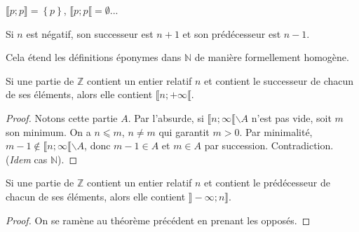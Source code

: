 \begin{remark}
\(⟦𝑝;𝑝⟧=\left\{𝑝\right\}\), \(⟦𝑝;𝑝⟦=∅\)...
\end{remark}
\begin{terminology}
Si \(𝑛\) est négatif, son successeur est \(𝑛+1\) et son prédécesseur est \(𝑛-1\).
\end{terminology}
\begin{remark}
Cela étend les définitions éponymes dans \(ℕ\) de manière formellement homogène.
\end{remark}
\begin{theorem}
Si une partie de \(ℤ\) contient un entier relatif \(𝑛\) et contient le successeur de chacun de ses éléments, alors elle
contient \(⟦𝑛;+∞⟦\).
\end{theorem}
\begin{proof}
Notons cette partie \(𝐴\). Par l'absurde, si \(⟦𝑛;∞⟦∖𝐴\) n'est pas vide, soit \(𝑚\) son minimum. On a \(𝑛⩽𝑚\),
\(𝑛≠𝑚\) qui garantit \(𝑚>0\). Par minimalité, \(𝑚-1∉⟦𝑛;∞⟦∖𝐴\), donc \(𝑚-1∈𝐴\) et \(𝑚∈𝐴\) par succession.
Contradiction. (\emph{Idem} cas \(ℕ\)).
\end{proof}
\begin{theorem}
Si une partie de \(ℤ\) contient un entier relatif \(𝑛\) et contient le prédécesseur de chacun de ses éléments, alors elle
contient \(⟧-∞;𝑛⟧\).
\end{theorem}
\begin{proof}
On se ramène au théorème précédent en prenant les opposés.
\end{proof}
